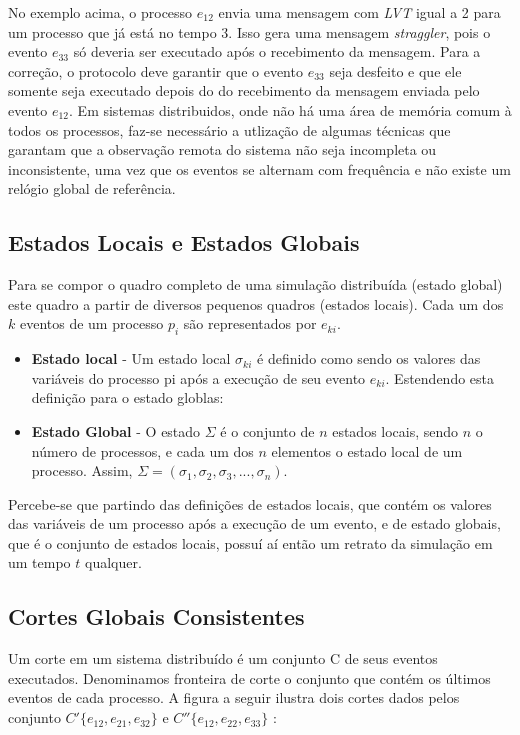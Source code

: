 	No exemplo acima, o processo $e_{12}$ envia uma mensagem com \textit{LVT} igual a 2 para um processo que já está no tempo 3. Isso gera uma mensagem \textit{straggler}, pois o evento $e_{33}$ só deveria ser executado após o recebimento da mensagem. Para a correção, o protocolo deve garantir que o evento $e_{33}$ seja desfeito e que ele somente seja executado depois do do recebimento da mensagem enviada pelo evento $e_{12}$.
	Em sistemas distribuidos, onde não há uma área de memória comum à todos os processos, faz-se necessário a utlização de algumas técnicas que garantam que a observação remota do sistema não seja incompleta ou inconsistente, uma vez que os eventos se alternam com frequência e não existe um relógio global de referência.
	
\subsection{Estados Locais e Estados Globais}
Para se compor o quadro completo de uma simulação distribuída (estado global)  este quadro a partir de diversos pequenos quadros (estados locais). Cada um dos $k$ eventos de um processo $p_i$ são representados por $e_{ki}$.
\begin{itemize}
	\item \textbf{Estado local} - Um estado local $ \sigma_{ki} $ é definido como sendo os valores das variáveis do processo pi após a execução de seu evento $e_{ki}$.
	Estendendo esta definição para o estado globlas:


	\item \textbf{Estado Global} -  O estado $\Sigma$ é o conjunto de $n$ estados locais, sendo $n$ o número de processos, e cada um dos $n$ elementos o estado local de um processo. Assim, $ \Sigma = (\sigma_1, \sigma_2, \sigma_3, ..., \sigma_n)$.
\end{itemize}


	Percebe-se que partindo das definições de estados locais, que contém os valores das variáveis de um processo após a execução de um evento, e de estado globais, que é o conjunto de estados locais, possuí aí então um retrato da simulação em um tempo $t$ qualquer.

\subsection{Cortes Globais Consistentes}
Um corte em um sistema distribuído é um conjunto C de seus eventos executados. Denominamos fronteira de corte o conjunto que contém os últimos eventos de cada processo. A figura a seguir ilustra dois cortes dados pelos conjunto $C'\{e_{12}, e_{21}, e_{32}\}$ e $C''\{e_{12}, e_{22}, e_{33}\}$ :

